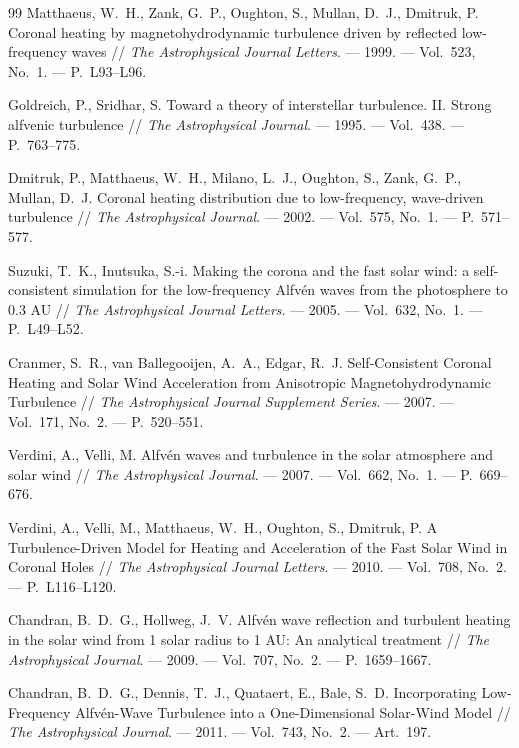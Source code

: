 \documentclass[11pt,a4paper]{article}
\begin{document}
\begin{thebibliography}{99}
Matthaeus, W.~H., Zank, G.~P., Oughton, S., Mullan, D.~J., Dmitruk, P. Coronal heating by magnetohydrodynamic turbulence driven by reflected low-frequency waves // \emph{The Astrophysical Journal Letters}. --- 1999. --- Vol.~523, No.~1. --- P.~L93--L96.

Goldreich, P., Sridhar, S. Toward a theory of interstellar turbulence. II. Strong alfvenic turbulence // \emph{The Astrophysical Journal}. --- 1995. --- Vol.~438. --- P.~763--775.

Dmitruk, P., Matthaeus, W.~H., Milano, L.~J., Oughton, S., Zank, G.~P., Mullan, D.~J. Coronal heating distribution due to low-frequency, wave-driven turbulence // \emph{The Astrophysical Journal}. --- 2002. --- Vol.~575, No.~1. --- P.~571--577.

Suzuki, T.~K., Inutsuka, S.-i. Making the corona and the fast solar wind: a self-consistent simulation for the low-frequency Alfv\'en waves from the photosphere to 0.3 AU // \emph{The Astrophysical Journal Letters}. --- 2005. --- Vol.~632, No.~1. --- P.~L49--L52.

Cranmer, S.~R., van Ballegooijen, A.~A., Edgar, R.~J. Self-Consistent Coronal Heating and Solar Wind Acceleration from Anisotropic Magnetohydrodynamic Turbulence // \emph{The Astrophysical Journal Supplement Series}. --- 2007. --- Vol.~171, No.~2. --- P.~520--551.

Verdini, A., Velli, M. Alfv\'en waves and turbulence in the solar atmosphere and solar wind // \emph{The Astrophysical Journal}. --- 2007. --- Vol.~662, No.~1. --- P.~669--676.

Verdini, A., Velli, M., Matthaeus, W.~H., Oughton, S., Dmitruk, P. A Turbulence-Driven Model for Heating and Acceleration of the Fast Solar Wind in Coronal Holes // \emph{The Astrophysical Journal Letters}. --- 2010. --- Vol.~708, No.~2. --- P.~L116--L120.

Chandran, B.~D.~G., Hollweg, J.~V. Alfv\'en wave reflection and turbulent heating in the solar wind from 1 solar radius to 1 AU: An analytical treatment // \emph{The Astrophysical Journal}. --- 2009. --- Vol.~707, No.~2. --- P.~1659--1667.

Chandran, B.~D.~G., Dennis, T.~J., Quataert, E., Bale, S.~D. Incorporating Low-Frequency Alfv\'en-Wave Turbulence into a One-Dimensional Solar-Wind Model // \emph{The Astrophysical Journal}. --- 2011. --- Vol.~743, No.~2. --- Art.~197.


\end{thebibliography}
\end{document}
